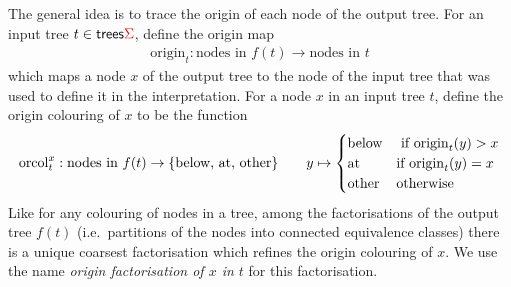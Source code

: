 \newcommand{\origin}[1]{\mathrm{origin}_{#1}}
\newcommand{\orcol}[2]{\mathrm{orcol}_{#1}^{#2}}
The general idea is to trace the origin of each node of the output tree. For an input tree $t \in \mathsf {trees} {\color{red}{\Sigma}}$, define the origin map
\begin{align*}
\origin t : \text{nodes in $f(t)$} \to \text{nodes in $t$}
\end{align*}
which maps a node $x$ of the output tree to the node of the input tree that was used to define it in the interpretation. For a node $x$ in an input tree $t$, define the origin colouring of $x$ to be the function 
\begin{align*}
\orcol t x : \text{nodes in $f(t)$} \to \set{\text{below, at, other}} \qquad y \mapsto \begin{cases}
    \text{below} & \text{ if }\origin t(y) > x\\
    \text{at} & \text{if }\origin t(y) = x \\
    \text{other} & \text{otherwise}
\end{cases}
\end{align*}
Like for any colouring of nodes in a tree, among the factorisations of the output tree $f(t)$ (i.e.~partitions of the nodes into connected equivalence classes) there is a unique coarsest factorisation which refines the origin colouring of $x$. We use the name \emph{origin factorisation of $x$ in $t$} for this factorisation. 


